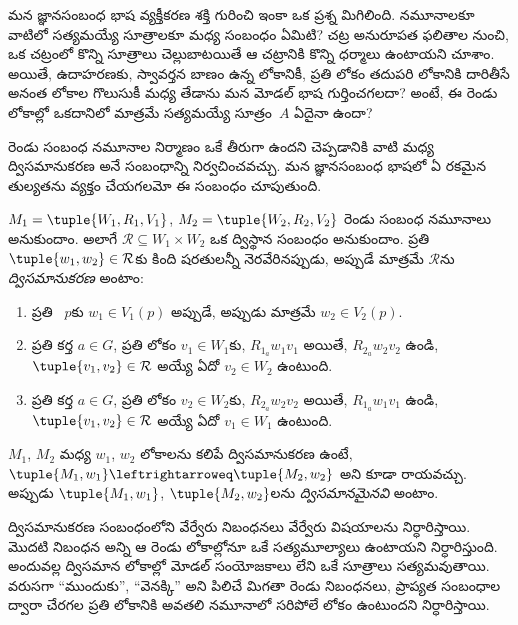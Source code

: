 \documentclass[../../../include/open-logic-section]{subfiles}
\begin{document}


మన జ్ఞానసంబంధ భాష వ్యక్తీకరణ శక్తి గురించి ఇంకా
ఒక ప్రశ్న మిగిలింది. నమూనాలకూ వాటిలో సత్యమయ్యే
సూత్రాలకూ మధ్య సంబంధం ఏమిటి? చట్ర అనురూపత
ఫలితాల నుంచి, ఒక చట్రంలో కొన్ని సూత్రాలు
చెల్లుబాటయితే ఆ చట్రానికి కొన్ని ధర్మాలు
ఉంటాయని చూశాం. అయితే, ఉదాహరణకు, స్వావర్తన
బాణం ఉన్న లోకానికీ, ప్రతి లోకం తదుపరి లోకానికి
దారితీసే అనంత లోకాల గొలుసుకీ మధ్య తేడాను
మన మోడల్ భాష గుర్తించగలదా? అంటే, ఈ రెండు
లోకాల్లో ఒకదానిలో మాత్రమే సత్యమయ్యే సూత్రం~$A$
ఏదైనా ఉందా?

రెండు సంబంధ నమూనాల నిర్మాణం ఒకే తీరుగా ఉందని
చెప్పడానికి వాటి మధ్య ద్విసమానుకరణ అనే సంబంధాన్ని
నిర్వచించవచ్చు. మన జ్ఞానసంబంధ భాషలో ఏ రకమైన తుల్యతను
వ్యక్తం చేయగలమో ఈ సంబంధం చూపుతుంది.

\begin{defn}[ద్విసమానుకరణ]
$M_1 = \tuple{W_1, R_1, V_1}$, $M_2 = \tuple{W_2, R_2, V_2}$
రెండు సంబంధ నమూనాలు అనుకుందాం. అలాగే
$\mathcal{R} \subseteq W_1 \times W_2$ ఒక ద్విస్థాన
సంబంధం అనుకుందాం. ప్రతి $\tuple{w_1, w_2} \in \mathcal{R}$కు
కింది షరతులన్నీ నెరవేరినప్పుడు, అప్పుడే మాత్రమే $\mathcal{R}$ను
\emph{ద్విసమానుకరణ} అంటాం:

\begin{enumerate}
  \item ప్రతి ~$p$కు
  $w_1 \in V_1(p)$ అప్పుడే, అప్పుడు మాత్రమే $w_2 \in V_2(p)$.
  \item ప్రతి కర్త $a \in G$, ప్రతి లోకం $v_1 \in W_1$కు,
  $R_{1_a} w_1 v_1$ అయితే, $R_{2_a} w_2 v_2$ ఉండి,
  $\tuple{v_1, v_2} \in
  \mathcal{R}$ అయ్యే ఏదో $v_2 \in W_2$ ఉంటుంది.
  \item ప్రతి కర్త $a \in G$, ప్రతి లోకం $v_2 \in W_2$కు,
   $R_{2_a} w_2 v_2$ అయితే, $R_{1_a} w_1 v_1$ ఉండి,
   $\tuple{v_1, v_2} \in
   \mathcal{R}$ అయ్యే ఏదో $v_1 \in W_1$ ఉంటుంది.
\end{enumerate}

$M_1$, $M_2$ మధ్య $w_1$, $w_2$ లోకాలను కలిపే
ద్విసమానుకరణ ఉంటే, $\tuple{M_1, w_1} \leftrightarroweq
\tuple{M_2, w_2}$ అని కూడా రాయవచ్చు. అప్పుడు
$\tuple{M_1, w_1}$, $\tuple{M_2, w_2}$లను
\emph{ద్విసమానమైనవి} అంటాం.
\end{defn}

ద్విసమానుకరణ సంబంధంలోని వేర్వేరు నిబంధనలు
వేర్వేరు విషయాలను నిర్ధారిస్తాయి. మొదటి నిబంధన
అన్ని 
ఆ రెండు లోకాల్లోనూ ఒకే సత్యమూల్యాలు ఉంటాయని నిర్ధారిస్తుంది.
అందువల్ల ద్విసమాన లోకాల్లో మోడల్ సంయోజకాలు లేని ఒకే సూత్రాలు
సత్యమవుతాయి. వరుసగా ``ముందుకు'', ``వెనక్కి''
అని పిలిచే మిగతా రెండు నిబంధనలు, ప్రాప్యత
సంబంధాల ద్వారా చేరగల ప్రతి లోకానికి అవతలి నమూనాలో
సరిపోలే లోకం ఉంటుందని నిర్ధారిస్తాయి.
\end{document}
